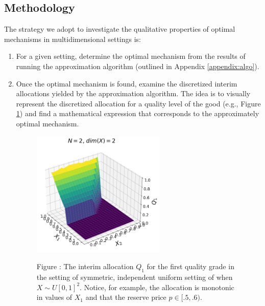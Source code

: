 \subsection{Methodology}\label{subsec_method}


The strategy we adopt to investigate the qualitative properties of optimal mechanisms in multidimensional settings is:

\begin{enumerate}
    \item For a given setting, determine the optimal mechanism from the results of running the approximation algorithm (outlined in Appendix \ref{appendix:algo}).

    \item Once the optimal mechanism is found, examine the discretized interim allocations yielded by the approximation algorithm. The idea is to visually represent the discretized allocation for a quality level of the good (e.g., Figure \ref{fig:belloni_n2_q1}) and find a mathematical expression that corresponds to the approximately optimal mechanism.

    \begin{figure}[H]
        \begin{center}
        \includegraphics[width=0.6\textwidth]{images/symmetric_independent_unif_01_Q1.png}
        \end{center}
        
        \vspace{1mm}
        \raggedright{\small {\sc Figure \thefig\label{fig:belloni_n2_q1}:} The interim allocation $Q_1$ for the first quality grade in the setting of symmetric, independent uniform setting of \autocite{pavlov2011optimal} when $X \sim U[0,1]^2$. Notice, for example, the allocation is monotonic in values of $X_1$ and that the reserve price $p \in [.5, .6)$.}
    \end{figure}


\end{enumerate}
